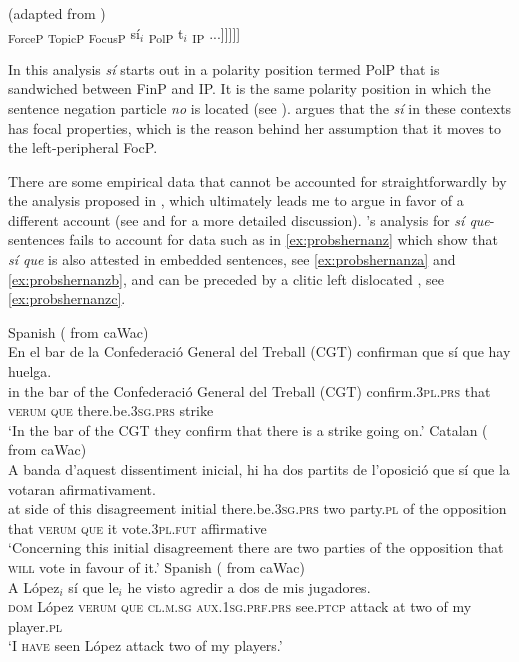 \ea\label{struc:hernsi} (adapted from \citealt[129: ex 48]{Hernanz2007})\\ 	{\ob}\textsubscript{ForceP} {\ob}\textsubscript{TopicP} {\ob}\textsubscript{FocusP} sí$_i$ {\ob}\textsubscript{PolP} t$_i$ {\ob}\textsubscript{IP} ...]]]]] 
  \z

In this analysis \emph{sí} starts out in a polarity position termed PolP that is sandwiched between FinP and IP. It is the same polarity position in which the sentence negation particle \emph{no} is located  (see \citealt{Laka1990}). \citet{Hernanz2007} argues that the \emph{sí} in these contexts has focal properties, which is the reason behind her assumption that it moves  to the left-peripheral FocP.


There are some empirical data that cannot be accounted for straightforwardly  by the analysis proposed in \citet{Hernanz2007}, which  ultimately leads me to argue in favor of a different account (see  and \citealt{Kocher2017} for a more detailed discussion). \citeauthor{Hernanz2007}'s analysis for \emph{sí que}-sentences fails to account for data such as in \eqref{ex:probshernanz}  which show that \emph{sí que} is also attested in embedded sentences, see \eqref{ex:probshernanza} and \eqref{ex:probshernanzb}, and can be preceded by a clitic left dislocated , see \eqref{ex:probshernanzc}.


\ea \label{ex:probshernanz}
\ea\label{ex:probshernanza}
		Spanish (\citealt[94: ex 32b]{Kocher2017} from caWac)\\
\gll  En el bar de la Confederació General del Treball (CGT) confirman 	que sí que hay
			huelga. \\
			in the bar of the Confederació General del Treball (CGT) confirm.\textsc{3pl.prs} that \textsc{verum} \textsc{que} there.be.\textsc{3sg.prs} strike\\
			\glt `In the bar of the CGT they confirm that there is a strike going on.' 
		\ex \label{ex:probshernanzb}
		Catalan (\citealt[45: ex 88b]{Kocher2017a} from caWac)\\
		\gll A banda d'aquest dissentiment inicial, hi ha dos partits de l'oposició que sí que la votaran afirmativament. \\
		at side {of this} disagreement initial there.be.\textsc{3sg.prs} two party.\textsc{pl} of {the opposition} that \textsc{verum} \textsc{que} it vote.\textsc{3pl.fut} affirmative\\
		\glt `Concerning this initial disagreement there are two parties of the opposition  that \textsc{will} vote in favour of it.'
\pagebreak\ex \label{ex:probshernanzc}
		Spanish (\citealt[94: ex 32a]{Kocher2017a} from caWac)\\
\gll	A López$_i$ sí que le$_i$ he visto agredir a dos de mis jugadores.\\
\textsc{dom} López \textsc{verum} \textsc{que} \textsc{cl.m.sg}  \textsc{aux.1sg.prf.prs} see.\textsc{ptcp} attack at two of my player.\textsc{pl}\\
\glt `I \textsc{have} seen López attack two of my players.'
		\z
\z


